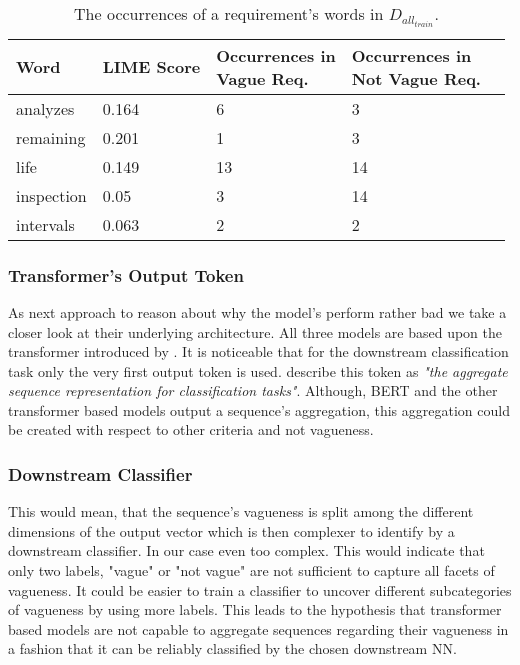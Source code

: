 \begin{table}[htpb]
    \centering
    \begin{tabular}{l | l l l l }
        \toprule
         Word & \ac{LIME} Score & \makecell{Occurrences in\\Vague Req.} & \makecell{Occurrences in\\Not Vague Req.} \\
        \hline
        analyzes & 0.164 & 6 & 3 \\
        remaining & 0.201 & 1 & 3  \\
        life & 0.149 & 13 & 14\\
        inspection & 0.05 & 3 & 14 \\
        intervals & 0.063 & 2 & 2 \\
        \bottomrule
    \end{tabular}
    \caption[Study Interpretation: Word Occurrences]{The occurrences of a requirement's words in $D_{all_{train}}$.}\label{tab:study:interpretation:LIME}
\end{table}

\subsubsection{Transformer's Output Token}
\label{chp:study:sec:interpretation:subsec:causes:transformer_ouput_token}
As next approach to reason about why the model's perform rather bad we take a closer look at their underlying architecture.
All three models are based upon the transformer introduced by \textcite{Vaswani:2017}.
It is noticeable that for the downstream classification task only the very first output token is used.
\Textcite{Devlin:2018} describe this token as \textit{"the aggregate sequence representation for classification tasks"}.
Although, \ac{BERT} and the other transformer based models output a sequence's aggregation, this aggregation could be created with respect to other criteria and not vagueness.


\subsubsection{Downstream Classifier}
\label{chp:study:sec:interpretation:subsec:causes:downstream_classifier}
This would mean, that the sequence's vagueness is split among the different dimensions of the output vector which is then complexer to identify by a downstream classifier.
In our case even too complex.
This would indicate that only two labels, "vague" or "not vague" are not sufficient to capture all facets of vagueness.
It could be easier to train a  classifier to uncover different subcategories of vagueness by using more labels.
This leads to the hypothesis that transformer based models are not capable to aggregate sequences regarding their vagueness in a fashion that it can be reliably classified by the chosen downstream \ac{NN}.

